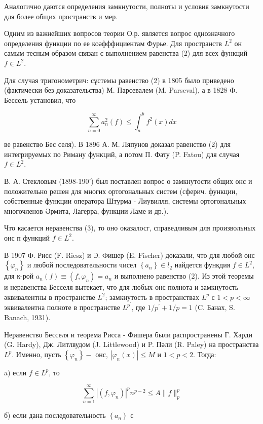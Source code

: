 \documentclass[10pt]{article}
\begin{document}
Аналогично даются определения замкнутости, полноты и условия замкнутости для более общих пространств и мер.

Одним из важнейших вопросов теории О.р. является вопрос однозначного определения функции по ее коәфффициентам Фурье. Для пространств $L^{2}$ он самым тесным образом связан с выполнением равенства (2) для всех функций $f \in L^{2}$.

Для случая тригонометрич: сұстемы равенство (2) в 1805 было приведено (фактически без доказательства) М. Парсевалем (M. Parseval), а в 1828 Ф. Бессель установил, что

\[
\sum_{n=0}^{\infty} a_{n}^{2}(f) \leqslant \int_{a}^{b} f^{2}(x) d x
\]

ве равенство Бес селя). В 1896 А. М. Ляпунов доказал равенство (2) для интегрируемых по Риману функций, а потом П. Фату (P. Fatou) для случая $f \in L^{2}$.

В. А. Стекловым (1898-190') был поставлен вопрос о замкнутости общих онс и положительно решен для многих ортогональных систем (сферич. функции, собственные функции оператора Штурма - Лиувилля, системы ортогональных многочленов Әрмита, Лагерра, функции Ламе и др.).

Что касается неравенства (3), то оно оказалосг, справедливым для произвольных онс п функций $f \in L^{2}$.

В 1907 Ф. Рисс (F. Riesz) и Э. Фишер (E. Fischer) доказали, что для любой онс $\left\{\varphi_{n}\right\}$ и любой последовательности чисел $\left\{a_{n}\right\} \in l_{2}$ найдется функдия $f \in L^{2}$, для к-рой $a_{n}(f) \equiv\left(f, \varphi_{n}\right)=a_{n}$ и выполнено равенство (2). Из этой теоремы и неравенства Бесселя вытекает, что для любых онс полнота и замкнутость әквивалентны в пространстве $L^{2}$; замкнутость в пространствах $L^{p}$ с $1<p<\infty$ эквивалентна полноте в пространстве $L^{p^{\prime}}$, где $1 / p^{\prime}+1 / p=1$ (C. Банах, S. Banach, 1931).

Неравенство Бесселя и теорема Рисса - Фишера были распространены Г. Харди (G. Hardy), Дж. Литлвудом (J. Littlewood) и P. Пәли (R. Paley) на пространства $L^{p}$. Именно, пусть $\left\{\varphi_{n}\right\}-$ онс, $\left|\varphi_{n}(x)\right| \leqslant M$ и $1<p<2$. Тогда:

a) если $f \in L^{p}$, то

\[
\sum_{n=1}^{\infty}\left|\left(f, \varphi_{n}\right)\right|^{p} n^{p-2} \leqslant A\|f\|_{p}^{p}
\]

б) если дана последовательность $\left\{a_{n}\right\}$ с
\end{document}
